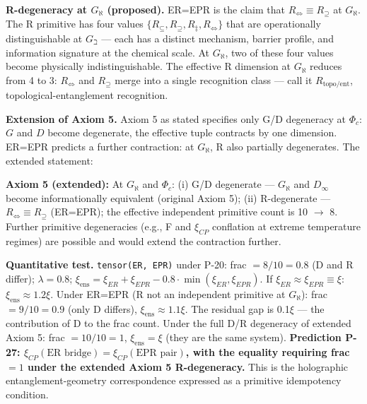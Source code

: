 \documentclass[12pt,a4paper]{article}
\begin{document}
\textbf{R-degeneracy at $G_{\aleph}$ (proposed).} ER=EPR is the claim that $R_{\Leftrightarrow} \equiv R_{\supseteq}$ at $G_{\aleph}$. The R primitive has four values $\{R_{\subseteq}, R_{\supseteq}, R_{\ddagger}, R_{\Leftrightarrow}\}$ that are operationally distinguishable at $G_{\beth}$ --- each has a distinct mechanism, barrier profile, and information signature at the chemical scale. At $G_{\aleph}$, two of these four values become physically indistinguishable. The effective R dimension at $G_{\aleph}$ reduces from 4 to 3: $R_{\Leftrightarrow}$ and $R_{\supseteq}$ merge into a single recognition class --- call it $R_{\text{topo/ent}}$, topological-entanglement recognition.

\textbf{Extension of Axiom 5.} Axiom 5 as stated specifies only G/D degeneracy at $\Phi_c$: $G$ and $D$ become degenerate, the effective tuple contracts by one dimension. ER=EPR predicts a further contraction: at $G_{\aleph}$, R also partially degenerates. The extended statement:

\textbf{Axiom 5 (extended):} At $G_{\aleph}$ and $\Phi_c$: (i) G/D degenerate --- $G_{\aleph}$ and $D_{\infty}$ become informationally equivalent (original Axiom 5); (ii) R-degenerate --- $R_{\Leftrightarrow} \equiv R_{\supseteq}$ (ER=EPR); the effective independent primitive count is 10 $\to$ 8. Further primitive degeneracies (e.g., F and $\xi_{CP}$ conflation at extreme temperature regimes) are possible and would extend the contraction further.

\textbf{Quantitative test.} \texttt{tensor(ER, EPR)} under P-20: frac $= 8/10 = 0.8$ (D and R differ); $\lambda = 0.8$; $\xi_{\text{ens}} = \xi_{ER} + \xi_{EPR} - 0.8 \cdot \min(\xi_{ER}, \xi_{EPR})$. If $\xi_{ER} \approx \xi_{EPR} \equiv \xi$: $\xi_{\text{ens}} \approx 1.2\xi$. Under ER=EPR (R not an independent primitive at $G_{\aleph}$): frac $= 9/10 = 0.9$ (only D differs), $\xi_{\text{ens}} \approx 1.1\xi$. The residual gap is 0.1$\xi$ --- the contribution of D to the frac count. Under the full D/R degeneracy of extended Axiom 5: frac $= 10/10 = 1$, $\xi_{\text{ens}} = \xi$ (they are the same system). \textbf{Prediction P-27: $\xi_{CP}(\text{ER bridge}) = \xi_{CP}(\text{EPR pair})$, with the equality requiring frac $= 1$ under the extended Axiom 5 R-degeneracy.} This is the holographic entanglement-geometry correspondence expressed as a primitive idempotency condition.
\end{document}
